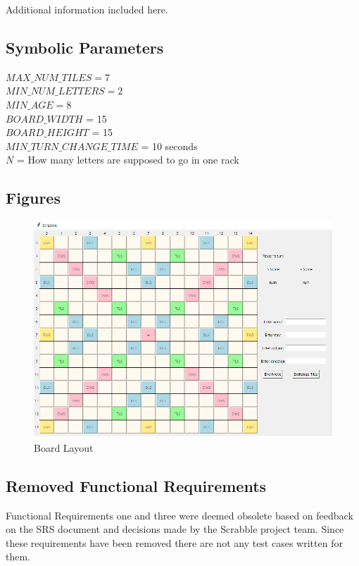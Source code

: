 \documentclass[12pt, titlepage]{article}
\begin{document}
Additional information included here.

\subsection{Symbolic Parameters}
$MAX\_NUM\_TILES= 7$\\
$MIN\_NUM\_LETTERS = 2$\\
$MIN\_AGE = 8$\\
$BOARD\_WIDTH$ = 15\\
$BOARD\_HEIGHT$ = 15\\
$MIN\_TURN\_CHANGE\_TIME$ = 10 seconds\\
$N$ = How many letters are supposed to go in one rack\\

\subsection{Figures}

\begin{figure}[H]
    \centering
    \includegraphics{TestPlan/Scrabble Board.png}
    \caption{Board Layout}
    \label{fig:my_label}
\end{figure}

\subsection{Removed Functional Requirements}
Functional Requirements one and three were deemed obsolete based on feedback on the SRS document and decisions made by the Scrabble project team. Since these requirements have been removed there are not any test cases written for them.\\
\end{document}

